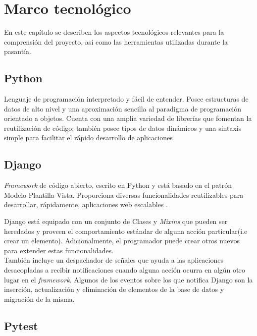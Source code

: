 \chapter{\textbf{Marco tecnológico}}

\thispagestyle{empty}

En este capítulo se describen los aspectos tecnológicos relevantes para la
comprensión del proyecto, así como las herramientas utilizadas durante la
pasantía.


\section{Python}

Lenguaje de programación interpretado y fácil de entender. Posee
estructuras de datos de alto nivel y una aproximación sencilla al paradigma de
programación orientado a objetos. Cuenta con una amplia variedad de librerías
que fomentan la reutilización de código; también posee tipos de datos dinámicos
y una sintaxis simple para facilitar el rápido desarrollo de aplicaciones
 \cite{Python_tutorial}

\section{Django}

\textit{Framework} de código abierto, escrito en Python y está basado en
el patrón Modelo-Plantilla-Vista. Proporciona diversas funcionalidades
reutilizables para desarrollar, rápidamente, aplicaciones web escalables
\cite{MVT}.

Django está equipado con un conjunto de Clases y \textit{Mixins} que pueden ser
heredados y proveen el comportamiento estándar de alguna acción particular(i.e
crear un elemento). Adicionalmente, el programador puede crear otros nuevos
para extender estas funcionalidades. \\

También incluye un despachador de señales que ayuda a las aplicaciones
desacopladas a recibir notificaciones cuando alguna acción ocurra en algún otro
lugar en el \textit{framework}. Algunos de los  eventos sobre los que notifica
Django son la inserción, actualización y eliminación de elementos de la base de
datos y migración de la misma.

\section{Pytest}

